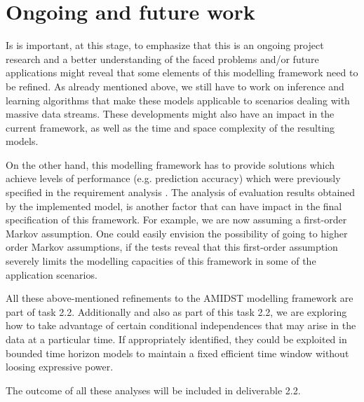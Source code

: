 \section{Ongoing and future work}\label{section:conclusions}

Is is important, at this stage, to emphasize that this is an ongoing project research and a better understanding of the faced problems and/or future applications might reveal that some elements of this modelling framework need to be refined. As already mentioned above,  we still have to work on inference and learning algorithms that make these models applicable to scenarios dealing with massive data streams. These developments might also have an impact in the current framework, as well as the time and space complexity of the resulting models.

On the other hand, this modelling framework has to provide solutions which achieve levels of performance (e.g. prediction accuracy) which were previously specified in the requirement analysis \cite{Fer14b}.  The analysis of evaluation results obtained by the implemented model, is another factor that can have impact in the final specification of this framework. For example, we are now assuming a first-order Markov assumption. One could easily envision the possibility of going to higher order Markov assumptions, if the tests reveal that this first-order assumption severely limits the modelling capacities of this framework in some of the application scenarios. 

All these above-mentioned refinements to the AMIDST modelling framework are part of task 2.2. Additionally and also as part of this task 2.2, we are exploring how to take advantage of certain conditional independences that may arise in the data at a particular time. If appropriately identified, they could be exploited in bounded time horizon models to maintain a fixed efficient time window without loosing expressive power.

The outcome of all these analyses will be included in deliverable 2.2.
